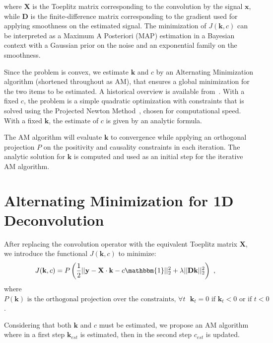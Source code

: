 \documentclass[]{elsarticle} %
\begin{document}
where $\textbf{X}$ is the Toeplitz  matrix corresponding to the convolution by the signal $\textbf{x}$, while  $\textbf{D}$ is the finite-difference matrix corresponding to the gradient used for applying smoothness on the estimated signal. The minimization of $J(\textbf{k},c)$ can be interpreted as a Maximum A Posteriori (MAP) estimation in a Bayesian context with a Gaussian prior on the noise and an exponential family on the smoothness.

Since the problem is convex, we estimate $\textbf{k}$ and $c$ by an Alternating Minimization algorithm (shortened throughout as AM), that ensures a global minimization for the two items to be estimated. A historical overview is available from~\cite{Z_Hydro_O_Sullivan_1998}. With a fixed $c$, the problem is a simple quadratic optimization with constraints that is solved using the Projected Newton Method~\cite{Z_Hydro_bertsekas1982}, chosen for computational speed. With a fixed $\textbf{k}$, the estimate of $c$ is given by an analytic formula.

The AM algorithm will evaluate $\textbf{k}$ to convergence while applying an orthogonal projection $P$ on the positivity and causality constraints in each iteration. The analytic solution for $\textbf{k}$ is computed and used as an initial step for the iterative AM algorithm.

\section{Alternating Minimization for 1D Deconvolution}
\label{sec:AM}

After replacing the convolution operator with the equivalent Toeplitz matrix $\textbf{X}$, we introduce the functional $J(\textbf{k}, c)$ to minimize:
\begin{equation}\label{4}
\begin{aligned}
& J(\textbf{k},c) =  P \left( \dfrac{1}{2} || \textbf{y} - \textbf{X} \cdot \textbf{k} - c \mathbbm{1}||_{2}^{2} + \lambda ||\textbf{Dk}||_{2}^{2} \right)\ ,
\end{aligned}
\end{equation}
where $ P(\textbf{k}) \text{  is the orthogonal projection over the constraints, } \forall t \text{   }  \textbf{k}_{t} = 0 \text{ if }  \textbf{k}_{t} < 0 \text{ or if } t<0$.

Considering that both $\textbf{k}$ and $c$ must be estimated, we propose an AM algorithm where in a first step $\textbf{k}_{est}$ is estimated, then in the second step $c_{est}$ is updated.
\end{document}
